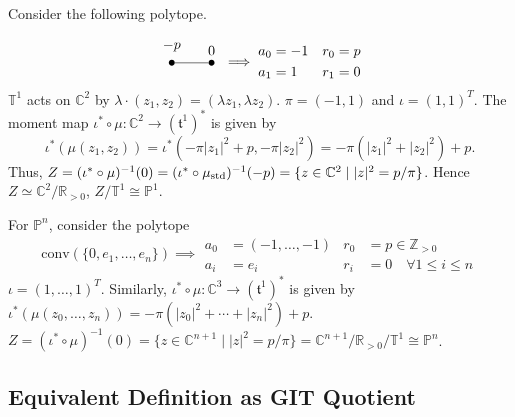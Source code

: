 \documentclass[b5paper]{article}
\begin{document}
\begin{example}{}
    Consider the following polytope.
    \begin{equation*}
        \begin{tikzpicture}[every node/.style={circle,fill=black,minimum width=1.5pt,inner sep=1.5pt}]
            \node[label={$-p$}] (A) at (0,0) {};
            \node[label={$0$}] (B) at (1,0) {};
            \draw (A) -- (B);
        \end{tikzpicture}
        \implies
        \begin{aligned}
            a_0 &= -1 & r_0 &= p \\
            a_1 &= 1 & r_1 &= 0
        \end{aligned}
    \end{equation*}
    $\mathbb{T}^1$ acts on $\mathbb{C}^2$ by $\lambda \cdot (z_1, z_2) = (\lambda z_1, \lambda z_2)$. $\pi=(-1,1)$ and $\iota=(1,1)^T$.
    The moment map $\iota^* \circ \mu : \mathbb{C}^2 \to (\mathfrak{t}^1)^*$ is given by
    \begin{equation*}
        \iota^*(\mu(z_1, z_2)) = \iota^*(-\pi|z_1|^2+p, -\pi|z_2|^2) = -\pi(|z_1|^2+|z_2|^2) + p.
    \end{equation*}
    Thus, $Z = (\iota^* \circ \mu)^{-1}(0) = (\iota^* \circ \mu_\textnormal{std})^{-1}(-p) = \{ z \in \mathbb{C}^2 \mid |z|^2 = p/\pi \}$. Hence $Z\simeq \mathbb{C}^2 / \mathbb{R}_{>0}$, $Z/\mathbb{T}^1 \cong \mathbb{P}^1$.

    For $\mathbb{P}^n$, consider the polytope
    \begin{equation*}
        \mathrm{conv}(\{ 0, e_1, \dots, e_n \})
        \implies
        \begin{aligned}
            a_0 &= (-1, \dots, -1) & r_0 &= p \in \mathbb{Z}_{>0} \\
            a_i &= e_i & r_i &= 0 \quad \forall 1 \leq i \leq n
        \end{aligned}
    \end{equation*}
    $\iota=(1,\dots ,1)^T$.
    Similarly, $\iota^* \circ \mu : \mathbb{C}^3 \to (\mathfrak{t}^1)^*$ is given by
    $\iota^*(\mu(z_0, \dots, z_n)) = -\pi(|z_0|^2+\cdots+|z_n|^2) + p$.
    $Z = (\iota^* \circ \mu)^{-1}(0) = \{ z \in \mathbb{C}^{n+1} \mid |z|^2 = p/\pi \}=\mathbb{C}^{n+1} / \mathbb{R}_{>0}/\mathbb{T}^1 \cong \mathbb{P}^n$.
\end{example}

\subsection{Equivalent Definition as GIT Quotient}
\end{document}
